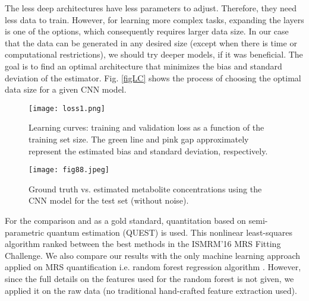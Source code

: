 \documentclass{llncs}
\begin{document}
The less deep architectures have less parameters to adjust. 
Therefore, they need less data to train. 
However, for learning more complex tasks, 
expanding the layers is one of the options, which consequently requires larger data size.
In our case that the data can be generated in any desired size (except when there is time or computational restrictions),
we should try deeper models, if it was beneficial. The goal is to find an optimal architecture that minimizes the bias and standard deviation of the estimator. Fig. \ref{figLC} shows the process of choosing the optimal data size for a given CNN model.



\begin{figure}[t!]
\centering
\begin{minipage}{.48\textwidth}
  \centering
  \texttt{[image: loss1.png]}
  \caption{Learning curves: training and validation loss as a function of the training set size.
    The green line and pink gap approximately represent the estimated bias and standard deviation, respectively.}
  \label{figLC}
\end{minipage}%
\hspace*{\fill}
\begin{minipage}{.48\textwidth}
  \centering
  \texttt{[image: fig88.jpeg]}
  \caption{Ground truth vs. estimated metabolite concentrations using the CNN model for the test set (without noise).}
  \label{figXY}
\end{minipage}
\end{figure}


For the comparison and as a gold standard, quantitation based on semi-parametric quantum estimation (QUEST) \cite{quest} is used. This nonlinear least-squares algorithm ranked between the best methods in the ISMRM'16 MRS Fitting Challenge. %
We also compare our results with the only machine learning approach applied on MRS quantification i.e. random forest regression algorithm \cite{das2017}. However, since the full details on the features used for the random forest is not given, we applied it on the raw data (no traditional hand-crafted feature extraction used). 
\end{document}
